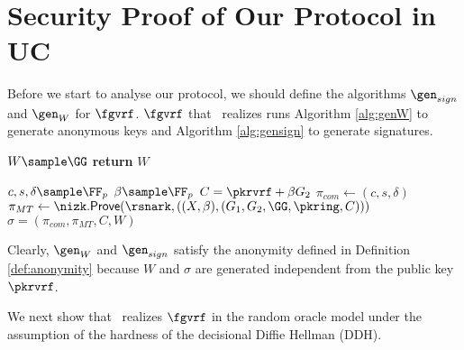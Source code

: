 \section{Security Proof of Our Protocol in UC}
Before we start to analyse our protocol, we should define the algorithms $ \gen_{sign} $ and $ \gen_W $ for $ \fgvrf $. $ \fgvrf $ that \name \ realizes runs Algorithm \ref{alg:genW} to generate  anonymous keys and Algorithm \ref{alg:gensign} to generate signatures.



\begin{algorithm}
	\caption{$\gen_{W}(\pkring,\pkrvrf,m)$}
	\label{alg:genW}	 	
	\begin{algorithmic}[1]
		\State$ W \sample\GG $
		\State \textbf{return} $ W $
	\end{algorithmic}
	
\end{algorithm}

\begin{algorithm}
	\caption{$\gen_{sign}(\pkring,W,\pkrvrf,m)$}
	\label{alg:gensign}	 	
	\begin{algorithmic}[1]
		\State $ c,s,\delta \sample \FF_p $
		\State $ \beta \sample \FF_p $
		\State $ C =  \pkrvrf + \beta G_2$
		\State $ \pi_{com}  \leftarrow (c,s,\delta)$
		\State $ \pi_{MT} \leftarrow \nizk.\mathsf{Prove}(\rsnark, ((X, \beta),(G_1,G_2, \GG,\pkring, C))) $ 
		\State\Return$ \sigma = (\pi_{com},\pi_{MT},C,W) $
	\end{algorithmic}
	
\end{algorithm}

Clearly, $ \gen_{W} $ and $ \gen_{sign} $ satisfy the anonymity defined in Definition \ref{def:anonymity} because $ W $ and $ \sigma $ are generated independent from the public key $ \pkrvrf $.


We next show that \name \ realizes $ \fgvrf $  in the random oracle model under the assumption of the hardness of the decisional Diffie Hellman (DDH).

